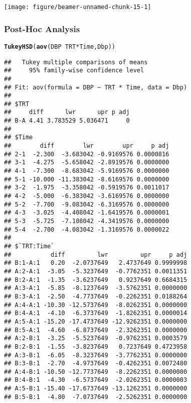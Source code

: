\documentclass[table,10pt]{beamer}\usepackage[]{graphicx}\usepackage[]{color}
\makeatletter
\newcommand{\hlopt}[1]{\textcolor[rgb]{0,0,0}{#1}}%
\newcommand{\hlstd}[1]{\textcolor[rgb]{0.345,0.345,0.345}{#1}}%
\newcommand{\hlkwd}[1]{\textcolor[rgb]{0.737,0.353,0.396}{\textbf{#1}}}%
\newenvironment{kframe}{%
 \def\at@end@of@kframe{}%
 \ifinner\ifhmode%
  \def\at@end@of@kframe{\end{minipage}}%
  \begin{minipage}{\columnwidth}%
 \fi\fi%
 \def\FrameCommand##1{\hskip\@totalleftmargin \hskip-\fboxsep
 \colorbox{shadecolor}{##1}\hskip-\fboxsep
     \hskip-\linewidth \hskip-\@totalleftmargin \hskip\columnwidth}%
 \MakeFramed {\advance\hsize-\width
   \@totalleftmargin\z@ \linewidth\hsize
   \@setminipage}}%
 {\par\unskip\endMakeFramed%
 \at@end@of@kframe}
\newenvironment{knitrout}{}{} %
\makeatother
\begin{document}
\begin{CJK*}{UTF8}{gbsn}
\begin{frame}[t,containsverbatim]
\begin{knitrout}
{\centering \texttt{[image: figure/beamer-unnamed-chunk-15-1]} 

}



\end{knitrout}
\end{frame}


\begin{frame}[t,containsverbatim]
\frametitle{Post-Hoc Analysis}
\begin{knitrout}\footnotesize
{}\color{fgcolor}\begin{kframe}
\begin{alltt}
\hlkwd{TukeyHSD}\hlstd{(}\hlkwd{aov}\hlstd{(DBP} \hlopt{~} \hlstd{TRT}\hlopt{*}\hlstd{Time, Dbp))}
\end{alltt}
\begin{verbatim}
##   Tukey multiple comparisons of means
##     95% family-wise confidence level
## 
## Fit: aov(formula = DBP ~ TRT * Time, data = Dbp)
## 
## $TRT
##     diff      lwr      upr p adj
## B-A 4.41 3.783529 5.036471     0
## 
## $Time
##        diff        lwr        upr     p adj
## 2-1  -2.300  -3.683042 -0.9169576 0.0000816
## 3-1  -4.275  -5.658042 -2.8919576 0.0000000
## 4-1  -7.300  -8.683042 -5.9169576 0.0000000
## 5-1 -10.000 -11.383042 -8.6169576 0.0000000
## 3-2  -1.975  -3.358042 -0.5919576 0.0011017
## 4-2  -5.000  -6.383042 -3.6169576 0.0000000
## 5-2  -7.700  -9.083042 -6.3169576 0.0000000
## 4-3  -3.025  -4.408042 -1.6419576 0.0000001
## 5-3  -5.725  -7.108042 -4.3419576 0.0000000
## 5-4  -2.700  -4.083042 -1.3169576 0.0000022
## 
## $`TRT:Time`
##           diff         lwr         upr     p adj
## B:1-A:1   0.20  -2.0737649   2.4737649 0.9999998
## A:2-A:1  -3.05  -5.3237649  -0.7762351 0.0011351
## B:2-A:1  -1.35  -3.6237649   0.9237649 0.6684315
## A:3-A:1  -5.85  -8.1237649  -3.5762351 0.0000000
## B:3-A:1  -2.50  -4.7737649  -0.2262351 0.0188264
## A:4-A:1 -10.30 -12.5737649  -8.0262351 0.0000000
## B:4-A:1  -4.10  -6.3737649  -1.8262351 0.0000014
## A:5-A:1 -15.20 -17.4737649 -12.9262351 0.0000000
## B:5-A:1  -4.60  -6.8737649  -2.3262351 0.0000000
## A:2-B:1  -3.25  -5.5237649  -0.9762351 0.0003579
## B:2-B:1  -1.55  -3.8237649   0.7237649 0.4723958
## A:3-B:1  -6.05  -8.3237649  -3.7762351 0.0000000
## B:3-B:1  -2.70  -4.9737649  -0.4262351 0.0072480
## A:4-B:1 -10.50 -12.7737649  -8.2262351 0.0000000
## B:4-B:1  -4.30  -6.5737649  -2.0262351 0.0000003
## A:5-B:1 -15.40 -17.6737649 -13.1262351 0.0000000
## B:5-B:1  -4.80  -7.0737649  -2.5262351 0.0000000

\end{verbatim}
\end{kframe}
\end{knitrout}
\end{frame}
\end{CJK*}
\end{document}
